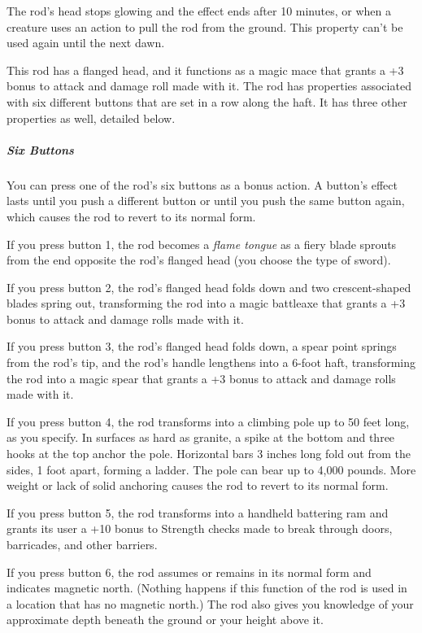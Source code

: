 \documentclass[10pt,a4paper,twoside,bg=print,twocolumn,openany,nodeprecatedcode]{dndbook}
\begin{document}
The rod's head stops glowing and the effect ends after 10 minutes, or when a creature uses an action to pull the rod from the ground. This property can't be used again until the next dawn.

This rod has a flanged head, and it functions as a magic mace that grants a +3 bonus to attack and damage roll made with it. The rod has properties associated with six different buttons that are set in a row along the haft. It has three other properties as well, detailed below.

\subparagraph{Six Buttons}
You can press one of the rod's six buttons as a bonus action. A button's effect lasts until you push a different button or until you push the same button again, which causes the rod to revert to its normal form.

If you press button 1, the rod becomes a \textit{flame tongue} as a fiery blade sprouts from the end opposite the rod's flanged head (you choose the type of sword).

If you press button 2, the rod's flanged head folds down and two crescent-shaped blades spring out, transforming the rod into a magic battleaxe that grants a +3 bonus to attack and damage rolls made with it.

If you press button 3, the rod's flanged head folds down, a spear point springs from the rod's tip, and the rod's handle lengthens into a 6-foot haft, transforming the rod into a magic spear that grants a +3 bonus to attack and damage rolls made with it.

If you press button 4, the rod transforms into a climbing pole up to 50 feet long, as you specify. In surfaces as hard as granite, a spike at the bottom and three hooks at the top anchor the pole. Horizontal bars 3 inches long fold out from the sides, 1 foot apart, forming a ladder. The pole can bear up to 4,000 pounds. More weight or lack of solid anchoring causes the rod to revert to its normal form.

If you press button 5, the rod transforms into a handheld battering ram and grants its user a +10 bonus to Strength checks made to break through doors, barricades, and other barriers.

If you press button 6, the rod assumes or remains in its normal form and indicates magnetic north. (Nothing happens if this function of the rod is used in a location that has no magnetic north.) The rod also gives you knowledge of your approximate depth beneath the ground or your height above it.
\end{document}
